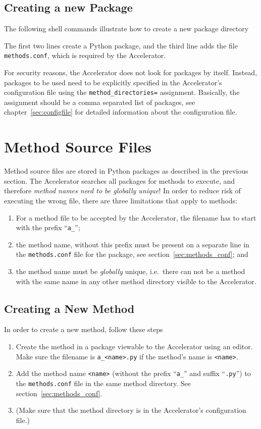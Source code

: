 \subsection{Creating a new Package}
The following shell commands illustrate how to create a new package
directory
\begin{shell}
\end{shell}
The first two lines create a Python package, and the third line adds
the file \texttt{methods.conf}, which is required by the Accelerator.

For security reasons, the Accelerator does not look for packages by
itself.  Instead, packages to be used need to be explicitly specified
in the Accelerator's configuration file using the
\texttt{method_directories=}
assignment.  Basically, the assignment should be a comma separated
list of packages, see chapter~\ref{sec:configfile} for detailed information about
the configuration file.


\section{Method Source Files}
Method source files are stored in Python packages as described in the
previous section.  The Accelerator searches all packages for methods
to execute, and therefore \textsl{method names need to be globally
unique}!  In order to reduce risk of executing the wrong file, there
are three limitations that apply to methods:
\begin{enumerate}
\item For a method file to be accepted by the Accelerator, the
  filename has to start with the prefix ``\texttt{a\_}'';
\item the method name, without this prefix must be present on a
  separate line in the \texttt{methods.conf} file for the package, see
  section~\ref{sec:methods_conf}; and
\item the method name must be \emph{globally} unique, i.e.\ there can
  not be a method with the same name in any other method directory
  visible to the Accelerator.
\end{enumerate}


\subsection{Creating a New Method}
In order to create a new method, follow these steps
\begin{enumerate}
\item Create the method in a package viewable to the Accelerator
    using an editor.  Make sure the filename is \texttt{a\_<name>.py} if
    the method's name is \texttt{<name>}.
\item Add the method name \texttt{<name>} (without the prefix ``\texttt{a\_}'' and
    suffix ``\texttt{.py}'') to the \texttt{methods.conf} file in the
    same method directory.  See section~\ref{sec:methods_conf}.
  \item (Make sure that the method directory is in the Accelerator's
    configuration file.)
\end{enumerate}



